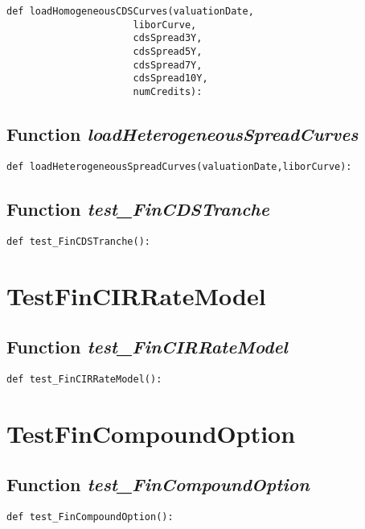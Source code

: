 \documentclass[twoside,11pt]{book}
\begin{document}
\begin{lstlisting}
def loadHomogeneousCDSCurves(valuationDate,
                      liborCurve,
                      cdsSpread3Y,
                      cdsSpread5Y,
                      cdsSpread7Y,
                      cdsSpread10Y,
                      numCredits):
\end{lstlisting}

\subsection{Function {\it loadHeterogeneousSpreadCurves}}


\begin{lstlisting}
def loadHeterogeneousSpreadCurves(valuationDate,liborCurve):
\end{lstlisting}

\subsection{Function {\it test\_FinCDSTranche}}


\begin{lstlisting}
def test_FinCDSTranche():
\end{lstlisting}


\newpage
\section{TestFinCIRRateModel}

\subsection{Function {\it test\_FinCIRRateModel}}


\begin{lstlisting}
def test_FinCIRRateModel():
\end{lstlisting}


\newpage
\section{TestFinCompoundOption}

\subsection{Function {\it test\_FinCompoundOption}}


\begin{lstlisting}
def test_FinCompoundOption():    
\end{lstlisting}
\end{document}
